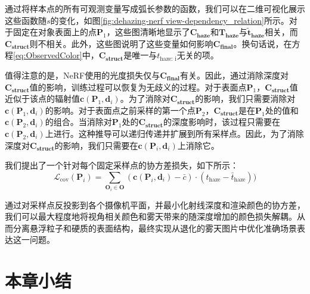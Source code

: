 通过将样本点的所有可观测变量写成弧长参数的函数，我们可以在二维可视化展示这些函数随$s$的变化，如图\ref{fig:dehazing-nerf view-dependency_relation}所示。对于固定在对象表面上的点$\mathbf{P}_1$，这些图清晰地显示了$\mathbf{C_\text{haze}}$和$\mathbf{T_\text{haze}}$与$\mathbf{\tilde{t}_\text{haze}}$相关，而$\mathbf{C_\text{struct}}$则不相关。此外，这些图说明了这些变量如何影响$\mathbf{C_\text{final}}$。换句话说，在方程\ref{eq:ObservedColor}中，$\mathbf{C_\text{struct}}$是唯一与${t}_\text{haze: i}$无关的项。

值得注意的是，NeRF使用的光度损失仅与$\mathbf{C_\text{final}}$有关。因此，通过消除深度对$\mathbf{C_\text{struct}}$值的影响，训练过程可以恢复为无歧义的过程。对于表面点$\mathbf{P}_1$，$\mathbf{C_\text{struct}}$值近似于该点的辐射值$\mathbf{c}(\mathbf{P}_1, \mathbf{d}_i)$。为了消除对$\mathbf{C_\text{struct}}$的影响，我们只需要消除对$\mathbf{c}(\mathbf{P}_1, \mathbf{d}_i)$的影响。对于表面点之前采样的第一个点$\mathbf{P}_2$，$\mathbf{C_\text{struct}}$是在$\mathbf{P}_1$处的值和$\mathbf{c}(\mathbf{P}_2, \mathbf{d}_i)$的组合。当消除对$\mathbf{P}_1$处的$\mathbf{C_\text{struct}}$的深度影响时，该过程只需要在$\mathbf{c}(\mathbf{P}_2, \mathbf{d}_i)$上进行。这种推导可以递归传递并扩展到所有采样点。因此，为了消除深度对$\mathbf{C_\text{struct}}$的影响，我们只需要在$\mathbf{c}(\mathbf{P}_i, \mathbf{d}_i)$上消除它。

我们提出了一个针对每个固定采样点的协方差损失，如下所示：
\begin{equation}
    \mathcal L_\text{cov}(\mathbf{P}_i) = \sum_{\mathbf{O}_i \in \mathbf{O}}(\mathbf{c}(\mathbf{P}_i, \mathbf{d}_i)-\bar{c})\cdot ({t}_\text{haze} - {\bar{t}}_\text{haze}))
\end{equation}

通过对采样点反投影到各个摄像机平面，并最小化射线深度和渲染颜色的协方差，我们可以最大程度地将视角相关颜色和雾天带来的随深度增加的颜色损失解耦。从而分离悬浮粒子和硬质的表面结构，最终实现从退化的雾天图片中优化准确场景表达这一问题。

\section{本章小结}